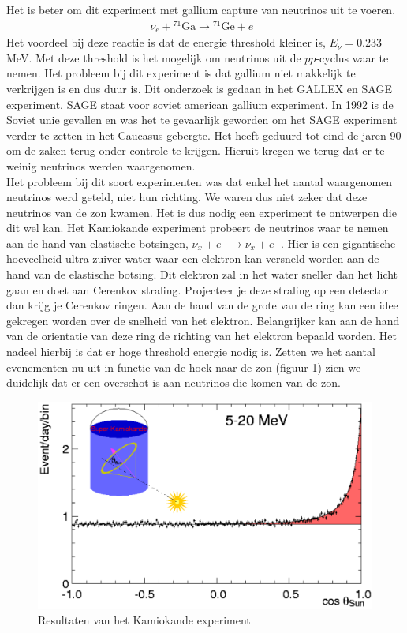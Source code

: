 \documentclass[../main.tex]{subfiles}
\begin{document}
Het is beter om dit experiment met gallium capture van neutrinos uit te voeren.
\begin{equation}
    \begin{aligned}
        \label{eq:ga_neutrino_capture}
        \nu_{e}+{ }^{71} \mathrm{Ga} \rightarrow{ }^{71} \mathrm{Ge}+e^{-}
    \end{aligned}
\end{equation}
Het voordeel bij deze reactie is dat de energie threshold kleiner is, $E_\nu = 0.233$MeV. Met deze threshold is het mogelijk om neutrinos uit de $pp$-cyclus waar te nemen. Het probleem bij dit experiment is dat gallium niet makkelijk te verkrijgen is en dus duur is. Dit onderzoek is gedaan in het GALLEX en SAGE experiment. SAGE staat voor soviet american gallium experiment. In 1992 is de Soviet unie gevallen en was het te gevaarlijk geworden om het SAGE experiment verder te zetten in het Caucasus gebergte. Het heeft geduurd tot eind  de jaren 90 om de zaken terug onder controle te krijgen. Hieruit kregen we terug dat er te weinig neutrinos werden waargenomen.\\
Het probleem bij dit soort experimenten was dat enkel het aantal waargenomen neutrinos werd geteld, niet hun richting. We waren dus niet zeker dat deze neutrinos van de zon kwamen. Het is dus nodig een experiment te ontwerpen die dit wel kan. Het Kamiokande experiment probeert de neutrinos waar te nemen aan de hand van elastische botsingen, $\nu_{x}+e^{-} \rightarrow \nu_{x}+e^{-}$. Hier is een gigantische hoeveelheid ultra zuiver water waar een elektron kan versneld worden aan de hand van de elastische botsing. Dit elektron zal in het water sneller dan het licht gaan en doet aan Cerenkov straling. Projecteer je deze straling op een detector dan krijg je Cerenkov ringen. Aan de hand van de grote van de ring kan een idee gekregen worden over de snelheid van het elektron. Belangrijker kan aan de hand van de orientatie van deze ring de richting van het elektron bepaald worden. Het nadeel hierbij is dat er hoge threshold energie nodig is. Zetten we het aantal evenementen nu uit in functie van de hoek naar de zon (figuur \ref{fig:neutrinos/kamiokande_results}) zien we duidelijk dat er een overschot is aan neutrinos die komen van de zon.

\begin{figure}[h]
    \centering
    \includegraphics[width=0.5\linewidth]{neutrinos/kamiokande_results.png}
    \caption{Resultaten van het Kamiokande experiment}%
    \label{fig:neutrinos/kamiokande_results}
\end{figure}
\end{document}
